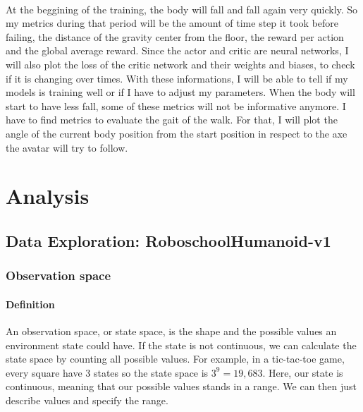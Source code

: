 \documentclass{article}
\begin{document}
\paragraph{}
At the beggining of the training, the body will fall and fall again very quickly.
So my metrics during that period will be the amount of time step it took before
failing, the distance of the gravity center from the floor, the reward per
action and the global average reward. Since the actor and critic are neural
networks, I will also plot the loss of the critic network and their weights and
biases, to check if it is changing over times. With these informations, I will
be able to tell if my models is training well or if I have to adjust my parameters.
When the body will start to have less fall, some of these metrics will not be
informative anymore. I have to find metrics to evaluate the gait of the walk.
For that, I will plot the angle of the current body position from the start
position in respect to the axe the avatar will try to follow. 

\newpage
\section{Analysis}

\subsection{Data Exploration: RoboschoolHumanoid-v1}

\subsubsection{Observation space}
\label{subsubsec:obs_space}

\paragraph{Definition} An observation space, or state space, is the shape and
the possible values an environment state could have. If the state is not
continuous, we can calculate the state space by counting all possible values.
For example, in a tic-tac-toe game, every square have 3 states so the state
space is $3^9 = 19,683$. Here, our state is continuous, meaning that our possible
values stands in a range. We can then just describe values and specify the range.
\end{document}
